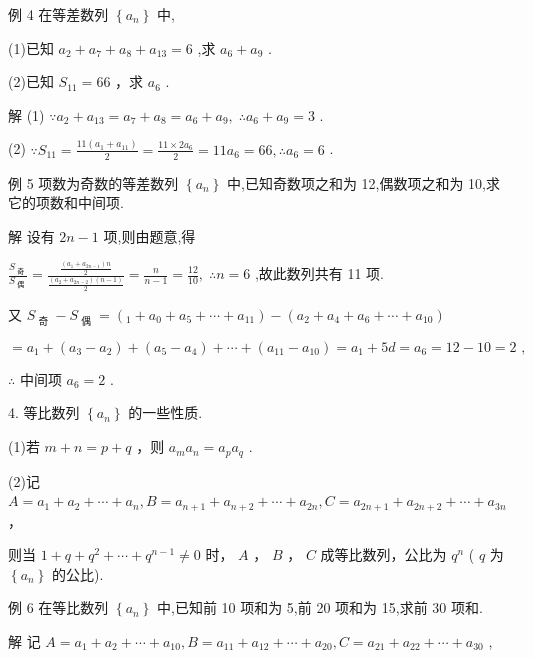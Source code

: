 \documentclass[10pt]{article}
\begin{document}
例 4 在等差数列 \(\left\{  {a}_{n}\right\}\) 中,

(1)已知 \({a}_{2} + {a}_{7} + {a}_{8} + {a}_{13} = 6\) ,求 \({a}_{6} + {a}_{9}\) .

(2)已知 \({S}_{11} = {66}\) ，求 \({a}_{6}\) .

解 (1) \(\because {a}_{2} + {a}_{13} = {a}_{7} + {a}_{8} = {a}_{6} + {a}_{9},\;\therefore {a}_{6} + {a}_{9} = 3\) .

(2) \(\because {S}_{11} = \frac{{11}\left( {{a}_{1} + {a}_{11}}\right) }{2} = \frac{{11} \times  2{a}_{6}}{2} = {11}{a}_{6} = {66},\therefore {a}_{6} = 6\) .

例 5 项数为奇数的等差数列 \(\left\{  {a}_{n}\right\}\) 中,已知奇数项之和为 12,偶数项之和为 10,求它的项数和中间项.

解 设有 \({2n} - 1\) 项,则由题意,得

\(\frac{{S}_{\text{ 奇 }}}{{S}_{\text{ 偶 }}} = \frac{\frac{\left( {{a}_{1} + {a}_{{2n} - 1}}\right) n}{2}}{\frac{\left( {{a}_{2} + {a}_{{2n} - 2}}\right) \left( {n - 1}\right) }{2}} = \frac{n}{n - 1} = \frac{12}{10},\;\therefore n = 6\) ,故此数列共有 11 项.

又 \({S}_{\text{ 奇 }} - {S}_{\text{ 偶 }} = \left( {{}_{1} + {a}_{0} + {a}_{5} + \cdots  + {a}_{11}}\right)  - \left( {{a}_{2} + {a}_{4} + {a}_{6} + \cdots  + {a}_{10}}\right)\)

\[
= {a}_{1} + \left( {{a}_{3} - {a}_{2}}\right)  + \left( {{a}_{5} - {a}_{4}}\right)  + \cdots  + \left( {{a}_{11} - {a}_{10}}\right)  = {a}_{1} + {5d} = {a}_{6} = {12} - {10} = 2\text{ , }
\]

\(\therefore\) 中间项 \({a}_{6} = 2\) .

4. 等比数列 \(\left\{  {a}_{n}\right\}\) 的一些性质.

(1)若 \(m + n = p + q\) ，则 \({a}_{m}{a}_{n} = {a}_{p}{a}_{q}\) .

(2)记 \(A = {a}_{1} + {a}_{2} + \cdots  + {a}_{n},B = {a}_{n + 1} + {a}_{n + 2} + \cdots  + {a}_{2n},C = {a}_{{2n} + 1} + {a}_{{2n} + 2} + \cdots  + {a}_{3n}\) ，

则当 \(1 + q + {q}^{2} + \cdots  + {q}^{n - 1} \neq  0\) 时， \(A\) ， \(B\) ， \(C\) 成等比数列，公比为 \({q}^{n}\) ( \(q\) 为 \(\left\{  {a}_{n}\right\}\) 的公比).

例 6 在等比数列 \(\left\{  {a}_{n}\right\}\) 中,已知前 10 项和为 5,前 20 项和为 15,求前 30 项和.

解 记 \(A = {a}_{1} + {a}_{2} + \cdots  + {a}_{10},B = {a}_{11} + {a}_{12} + \cdots  + {a}_{20},C = {a}_{21} + {a}_{22} + \cdots  + {a}_{30}\) ,
\end{document}
